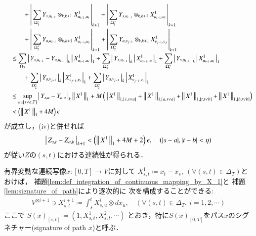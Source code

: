 \begin{prf}
\begin{description}
\begin{align}
					&\quad\qquad + \left|\, \sum_{\Omega_1^<} Y_{s,u_{i-1}} \otimes_{k,k+1} X^1_{u_{i-1},u_i}\, \right|_{k+1} 
					+ \left|\, \sum_{\Omega_1^>} Y_{s,u_{i-1}} \otimes_{k,k+1} X^1_{u_{i-1},u_i}\, \right|_{k+1} \\
					&\quad\qquad + \left|\, \sum_{\Omega_2^<} Y_{a,u_{i-1}} \otimes_{k,k+1} X^1_{u_{i-1},u_i}\, \right|_{k+1} 
					+ \left|\, \sum_{\Omega_2^>} Y_{a,v_{j-1}} \otimes_{k,k+1} X^1_{v_{j-1},v_j}\, \right|_{k+1} \\
					&\quad\leq \sum_{\Omega_3} \left|\, Y_{s,u_{i-1}} - Y_{a,u_{i-1}}\, \right|_{k}
					\left|\, X^1_{u_{i-1},u_i}\, \right|_{1}
					+ \sum_{\Omega_1^<} \left|\, Y_{s,u_{i-1}}\, \right|_{k}
						\left|\, X^1_{u_{i-1},u_i}\, \right|_{1}
					+ \sum_{\Omega_1^>} \left|\, Y_{s,u_{i-1}}\, \right|_{k}
						\left|\, X^1_{u_{i-1},u_i}\, \right|_{1} \\
					&\quad\qquad + \sum_{\Omega_2^<} \left|\, Y_{a,v_{j-1}}\, \right|_{k}
						\left|\, X^1_{v_{j-1},v_i}\, \right|_{1} 
					+ \sum_{\Omega_2^>} \left|\, Y_{a,v_{j-1}}\, \right|_{k}
						\left|\, X^1_{v_{j-1},v_i}\, \right|_{1} \\
					&\quad\leq \operatorname*{sup}_{u \in [s \vee a, T]} \left|\, Y_{s,u} - Y_{a,u}\, \right|_{k}
						\left\|\, X^1\, \right\|_{1}
						+ M \left( \left\|\, X^1\, \right\|_{1,[s,s \vee a]}
						+ \left\|\, X^1\, \right\|_{1,[a,s \vee a]} 
						+ \left\|\, X^1\, \right\|_{1,[t,t \vee b]} 
						+ \left\|\, X^1\, \right\|_{1,[b,t \vee b]} \right) \\
					&\quad< \left( \left\|\, X^1\, \right\|_{1} + 4 M \right) \epsilon 
				\end{align}
				が成立し，(iv)と併せれば
				\begin{align}
					\left|\, Z_{s,t} - Z_{a,b}\, \right|_{k+1} 
					< \left( \left\|\, X^1\, \right\|_{1} + 4 M + 2\right)\epsilon,
					\quad (|s-a|,|t-b| < \eta)
				\end{align}
				が従い$Z$の$(s,t)$における連続性が得られる．
				\QED
		\end{description}	
	\end{prf}
	
	\begin{screen}
		\begin{dfn}[パスのシグネチャー]
			有界変動な連続写像$x:[0,T] \longrightarrow V$に対して
			$X^1_{s,t} \coloneqq x_t-x_s,\ (\forall (s,t) \in \Delta_T)$とおけば，
			補題\ref{lem:def_integration_of_continuous_mapping_by_X_1}と
			補題\ref{lem:signature_of_path}により逐次的に
			次を構成することができる:
			\begin{align}
				V^{\otimes i+1} \ni X^{i+1}_{s,t} \coloneqq \int_s^t X^i_{s,u} \otimes dx_u,
				\quad (\forall (s,t) \in \Delta_T,\ i=1,2,\cdots)
			\end{align}
			ここで
			$S(x)_{[s,t]} \coloneqq (1,X^1_{s,t},X^2_{s,t},\cdots)$
			とおき，特に$S(x)_{[0,T]}$をパス$x$のシグネチャー(signature of path $x$)と呼ぶ．
		\end{dfn}
	\end{screen}
	

